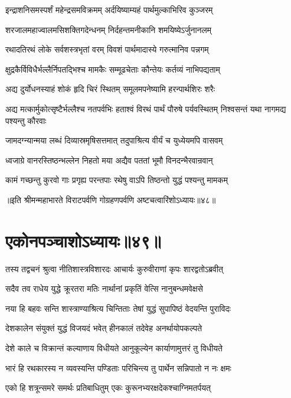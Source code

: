 \twolineshloka
{इन्द्राशनिसमस्पर्शं महेन्द्रसमविक्रमम्}
{अर्दयिष्याम्यहं पार्थमुल्काभिरिव कुञ्जरम्}


\twolineshloka
{शरजालमहाज्वालमसिशक्तिगदेन्धनम्}
{निर्दहन्तमनीकानि शमयिष्येऽर्जुनानलम्}


\twolineshloka
{रथादतिरथं लोके सर्वशस्त्रभृतां वरम्}
{विवशं पार्थमादास्ये गरुत्मानिव पन्नगम्}


\twolineshloka
{क्षुद्रकैर्विविधैर्भल्लैर्निपतद्भिश्च मामकैः}
{सम्मूढचेताः कौन्तेयः कर्तव्यं नाभिपद्यताम्}


\twolineshloka
{अद्य दुर्योधनस्याहं शोकं हृदि चिरं स्थितम्}
{समूलमपनेष्यामि हरन्पार्थशिरः शरैः}


\threelineshloka
{अद्य मत्कार्मुकोत्सृष्टैर्भल्लैश्च नतपर्वभिः}
{हताश्वं विरथं पार्थं पौरुषे पर्यवस्थितम्}
{निश्वसन्तं यथा नागमद्य पश्यन्तु कौरवाः}


\twolineshloka
{जामदग्न्यान्मया लब्धं दिव्यास्रमृषिसत्तमात्}
{तदुपाश्रित्य वीर्यं च युध्येयमपि वासवम्}


\twolineshloka
{ध्वजाग्रे वानरस्तिष्ठन्भल्लेन निहतो मया}
{अद्यैव पततां भूमौ विनदन्भैरवान्रवान्}


\twolineshloka
{कामं गच्छन्तु कुरवो गाः प्रगृह्य परन्तपाः}
{रथेषु वाऽपि तिष्ठन्तो युद्धं पश्यन्तु मामकम्}

॥इति श्रीमन्महाभारते विराटपर्वणि गोग्रहणपर्वणि अष्टचत्वारिंशोऽध्यायः॥४८॥

\chapter{एकोनपञ्चाशोऽध्यायः॥४९॥}

\twolineshloka
{तस्य तद्वचनं श्रुत्वा नीतिशास्त्रविशारदः}
{आचार्यः कुरुवीराणां कृपः शारद्वतोऽब्रवीत्}


\twolineshloka
{सदैव तव राधेय युद्धे क्रूरतरा मतिः}
{नार्थानां प्रकृतिं वेत्सि नानुबन्धमवेक्षसे}


\twolineshloka
{नया हि बहवः सन्ति शास्त्राण्याश्रित्य चिन्तिताः}
{तेषां युद्धं सुपापिष्ठं वेदयन्ति पुराविदः}


\twolineshloka
{देशकालेन संयुक्तं युद्धं विजयदं भवेत्}
{हीनकालं तदेवेह अनर्थायोपकल्पते}


\twolineshloka
{देशे काले च विक्रान्तं कल्याणाय विधीयते}
{आनुकूल्येन कार्याणामुत्तरं तु विधीयते}


\twolineshloka
{भारं हि रथकारस्य न व्यवस्यन्ति पण्डिताः}
{परिचिन्त्य तु पार्थेन सन्निपातो न नः क्षमः}


\twolineshloka
{एको हि शत्रून्समरे समर्थः प्रतिबाधितुम्}
{एकः कुरूनभ्यरक्षदेकश्चाग्निमतर्पयत्}


